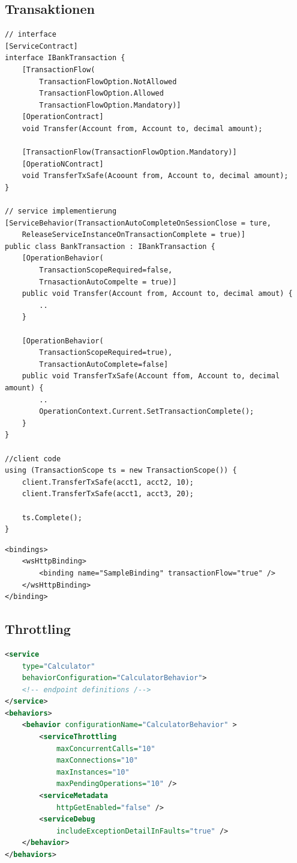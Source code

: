\documentclass[
a4paper,
oneside,
10pt,
fleqn,
headsepline,
toc=listofnumbered, 
bibliography=totocnumbered]{scrartcl}
\begin{document}
\subsection{Transaktionen}
\begin{lstlisting}
// interface
[ServiceContract] 
interface IBankTransaction {
	[TransactionFlow(
		TransactionFlowOption.NotAllowed
		TransactionFlowOption.Allowed
		TransactionFlowOption.Mandatory)]
	[OperationContract]
	void Transfer(Account from, Account to, decimal amount);
	
	[TransactionFlow(TransactionFlowOption.Mandatory)]
	[OperatioNContract]
	void TransferTxSafe(Acoount from, Account to, decimal amount);
}

// service implementierung
[ServiceBehavior(TransactionAutoCompleteOnSessionClose = ture,
	ReleaseServiceInstanceOnTransactionComplete = true)]
public class BankTransaction : IBankTransaction {
	[OperationBehavior(
		TransactionScopeRequired=false,
		TrnasactionAutoCompelte = true)]
	public void Transfer(Account from, Account to, decimal amout) {
		..
	}
	
	[OperationBehavior(
		TransactionScopeRequired=true),
		TransactionAutoComplete=false]
	public void TransferTxSafe(Account ffom, Account to, decimal amount) {
		..
		OperationContext.Current.SetTransactionComplete();
	}
}

//client code
using (TransactionScope ts = new TransactionScope()) {
	client.TransferTxSafe(acct1, acct2, 10);
	client.TransferTxSafe(acct1, acct3, 20);
	
	ts.Complete();
}
\end{lstlisting}

\begin{lstlisting}
<bindings>
	<wsHttpBinding>
		<binding name="SampleBinding" transactionFlow="true" />
	</wsHttpBinding>
</binding>
\end{lstlisting}

\subsection{Throttling}
\begin{lstlisting}[caption=Service Throttling, language=XML]
<service
	type="Calculator"
	behaviorConfiguration="CalculatorBehavior">
	<!-- endpoint definitions /-->
</service>
<behaviors>
	<behavior configurationName="CalculatorBehavior" >
		<serviceThrottling
			maxConcurrentCalls="10"
			maxConnections="10"
			maxInstances="10"
			maxPendingOperations="10" />
		<serviceMetadata
			httpGetEnabled="false" />
		<serviceDebug
			includeExceptionDetailInFaults="true" />
	</behavior>
</behaviors>
\end{lstlisting}
\end{document}
